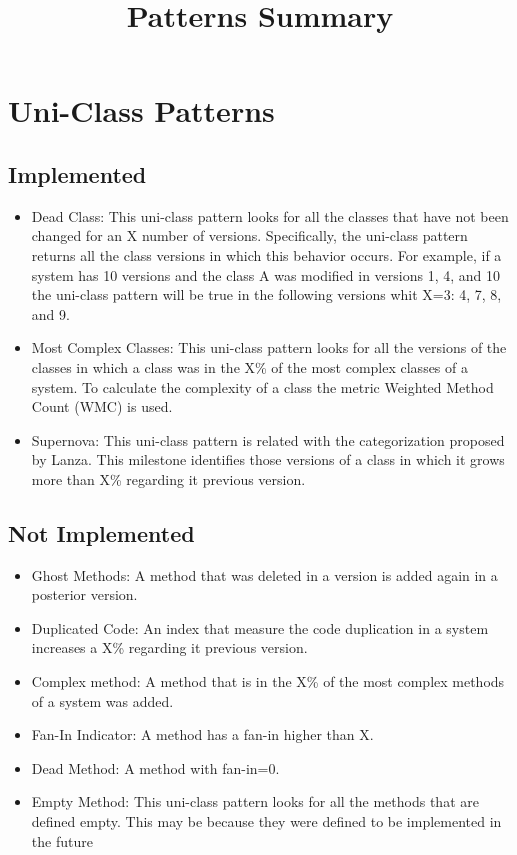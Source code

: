 \documentclass[11pt]{article} %
\title{Patterns Summary}
\date{} %
\begin{document}
\maketitle

\section{Uni-Class Patterns}

\subsection{Implemented}
\begin{itemize}
\item Dead Class: This uni-class pattern looks for all the classes that have not been changed for an X number of versions. Specifically, the uni-class pattern returns all the class versions in which this behavior occurs. For example, if a system has 10 versions and the class A was modified in versions 1, 4, and 10 the uni-class pattern will be true in the following versions whit X=3: 4, 7, 8, and 9.  
\item Most Complex Classes: This uni-class pattern looks for all the versions of the classes in which a class was in the X\% of the most complex classes of a system. To calculate the complexity of a class the metric Weighted Method Count (WMC) is used.   
\item Supernova: This uni-class pattern is related with the categorization proposed by Lanza. This milestone identifies those versions of a class in which it grows more than X\% regarding it previous version. 
\end{itemize}

\subsection{Not Implemented}
\begin{itemize}
\item Ghost Methods: A method that was deleted in a version is added again in a posterior version.
\item Duplicated Code: An index that measure the code duplication in a system increases a X\%  regarding it previous version.
\item Complex method: A method that is in the X\% of the most complex methods of a system was added.
\item Fan-In Indicator: A method has a fan-in higher than X.
\item Dead Method: A method with fan-in=0.
\item Empty Method: This uni-class pattern looks for all the methods that are defined empty. This may be because they were defined to be implemented in the future 
\end{itemize}
\end{document}
